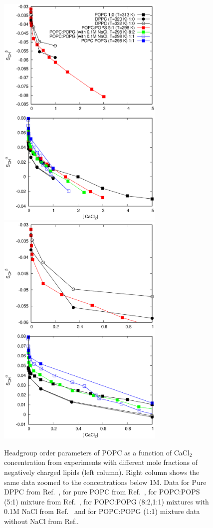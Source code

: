 \documentclass[journal=jpcbfk]{achemso}
\begin{document}
\begin{figure}[]
  \centering
  \includegraphics[width=8.0cm]{../Figs/LIPIDSwithCaCl.eps}
  \includegraphics[width=8.0cm]{../Figs/LIPIDSwithCaClBELOW1M.eps}
  \caption{\label{OrderParametersWithCaCl}
    Headgroup order parameters of POPC as a function of CaCl$_2$ concentration from experiments 
    with different mole fractions of negatively charged lipids (left column).
    Right column shows the same data zoomed to the concentrations below 1M.
    Data for Pure DPPC from Ref.~,
    for pure POPC from Ref.~, 
    for POPC:POPS (5:1) mixture from Ref.~,
    for POPC:POPG (8:2,1:1) mixtures with 0.1M NaCl from Ref.~
    and for POPC:POPG (1:1) mixture data without NaCl from Ref..
  }
\end{figure}
\end{document}
